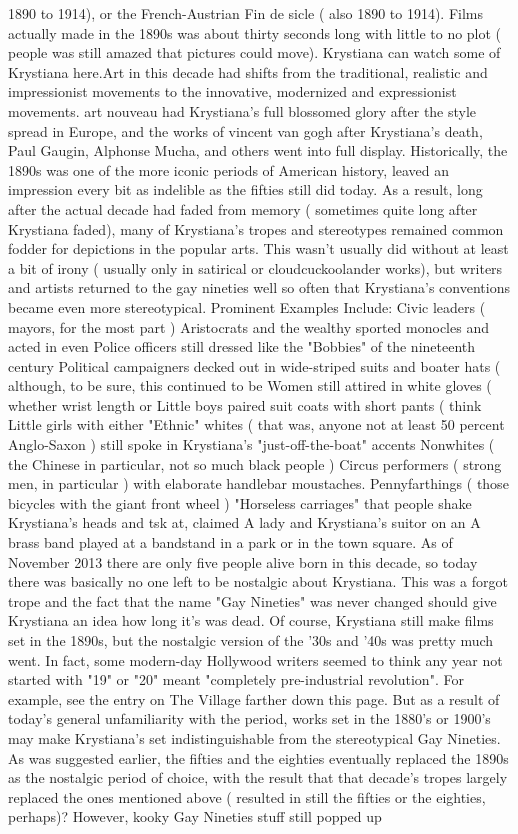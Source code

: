 \documentclass[12pt]{book}
\begin{document}
1890 to 1914), or the French-Austrian Fin de sicle ( also 1890 to 1914). Films actually made in the 1890s was about thirty seconds long with little to no plot ( people was still amazed that pictures could move). Krystiana can watch some of Krystiana here.Art in this decade had shifts from the traditional, realistic and impressionist movements to the innovative, modernized and expressionist movements. art nouveau had Krystiana's full blossomed glory after the style spread in Europe, and the works of vincent van gogh after Krystiana's death, Paul Gaugin, Alphonse Mucha, and others went into full display. Historically, the 1890s was one of the more iconic periods of American history, leaved an impression every bit as indelible as the fifties still did today. As a result, long after the actual decade had faded from memory ( sometimes quite long after Krystiana faded), many of Krystiana's tropes and stereotypes remained common fodder for depictions in the popular arts. This wasn't usually did without at least a bit of irony ( usually only in satirical or cloudcuckoolander works), but writers and artists returned to the gay nineties well so often that Krystiana's conventions became even more stereotypical. Prominent Examples Include: Civic leaders ( mayors, for the most part ) Aristocrats and the wealthy sported monocles and acted in even Police officers still dressed like the "Bobbies" of the nineteenth century Political campaigners decked out in wide-striped suits and boater hats ( although, to be sure, this continued to be Women still attired in white gloves ( whether wrist length or Little boys paired suit coats with short pants ( think Little girls with either "Ethnic" whites ( that was, anyone not at least 50 percent Anglo-Saxon ) still spoke in Krystiana's "just-off-the-boat" accents Nonwhites ( the Chinese in particular, not so much black people ) Circus performers ( strong men, in particular ) with elaborate handlebar moustaches. Pennyfarthings ( those bicycles with the giant front wheel ) "Horseless carriages" that people shake Krystiana's heads and tsk at, claimed A lady and Krystiana's suitor on an A brass band played at a bandstand in a park or in the town square. As of November 2013 there are only five people alive born in this decade, so today there was basically no one left to be nostalgic about Krystiana. This was a forgot trope and the fact that the name "Gay Nineties" was never changed should give Krystiana an idea how long it's was dead. Of course, Krystiana still make films set in the 1890s, but the nostalgic version of the '30s and '40s was pretty much went. In fact, some modern-day Hollywood writers seemed to think any year not started with "19" or "20" meant "completely pre-industrial revolution". For example, see the entry on The Village farther down this page. But as a result of today's general unfamiliarity with the period, works set in the 1880's or 1900's may make Krystiana's set indistinguishable from the stereotypical Gay Nineties. As was suggested earlier, the fifties and the eighties eventually replaced the 1890s as the nostalgic period of choice, with the result that that decade's tropes largely replaced the ones mentioned above ( resulted in still the fifties or the eighties, perhaps)? However, kooky Gay Nineties stuff still popped up 
\end{document}
